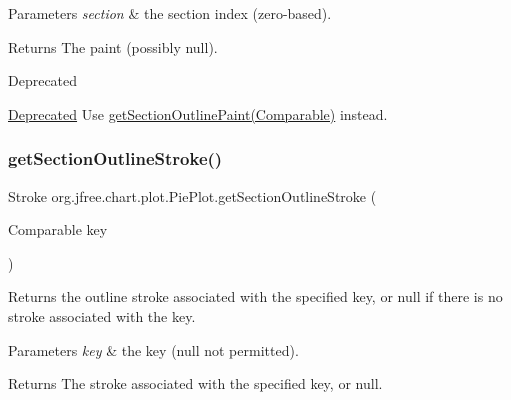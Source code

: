 \begin{DoxyParams}{Parameters}
{\em section} & the section index (zero-\/based).\\
\hline
\end{DoxyParams}
\begin{DoxyReturn}{Returns}
The paint (possibly {\ttfamily null}).
\end{DoxyReturn}
\begin{DoxyRefDesc}{Deprecated}
\item[\mbox{\hyperlink{deprecated__deprecated000072}{Deprecated}}]Use \mbox{\hyperlink{classorg_1_1jfree_1_1chart_1_1plot_1_1_pie_plot_ad5075d6d33c6dfbaab396a2b4a6b45bf}{get\+Section\+Outline\+Paint(\+Comparable)}} instead. \end{DoxyRefDesc}
\mbox{\label{classorg_1_1jfree_1_1chart_1_1plot_1_1_pie_plot_a5a568c273b4e925fd3c93647b806a9b9}} 
\subsubsection{\texorpdfstring{get\+Section\+Outline\+Stroke()}{getSectionOutlineStroke()}\hspace{0.1cm}{\footnotesize\ttfamily [1/3]}}
{\footnotesize\ttfamily Stroke org.\+jfree.\+chart.\+plot.\+Pie\+Plot.\+get\+Section\+Outline\+Stroke (\begin{DoxyParamCaption}\item[{Comparable}]{key }\end{DoxyParamCaption})}

Returns the outline stroke associated with the specified key, or {\ttfamily null} if there is no stroke associated with the key.


\begin{DoxyParams}{Parameters}
{\em key} & the key ({\ttfamily null} not permitted).\\
\hline
\end{DoxyParams}
\begin{DoxyReturn}{Returns}
The stroke associated with the specified key, or {\ttfamily null}.
\end{DoxyReturn}

